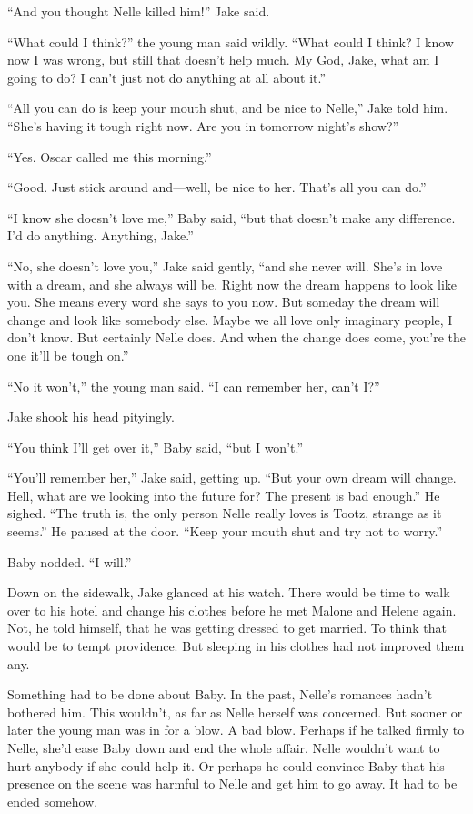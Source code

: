 \documentclass{novel}
\begin{document}
“And you thought Nelle killed him!” Jake said.

“What could I think?” the young man said wildly. “What could I think? I know now I was wrong, but still that doesn’t help much. My God, Jake, what am I going to do? I can’t just not do anything at all about it.”

“All you can do is keep your mouth shut, and be nice to Nelle,” Jake told him. “She’s having it tough right now. Are you in tomorrow night’s show?”

“Yes. Oscar called me this morning.”

“Good. Just stick around and—well, be nice to her. That’s all you can do.”

“I know she doesn’t love me,” Baby said, “but that doesn’t make any difference. I’d do anything. Anything, Jake.”

“No, she doesn’t love you,” Jake said gently, “and she never will. She’s in love with a dream, and she always will be. Right now the dream happens to look like you. She means every word she says to you now. But someday the dream will change and look like somebody else. Maybe we all love only imaginary people, I don’t know. But certainly Nelle does. And when the change does come, you’re the one it’ll be tough on.”

“No it won’t,” the young man said. “I can remember her, can’t I?”

Jake shook his head pityingly.

“You think I’ll get over it,” Baby said, “but I won’t.”

“You’ll remember her,” Jake said, getting up. “But your own dream will change. Hell, what are we looking into the future for? The present is bad enough.” He sighed. “The truth is, the only person Nelle really loves is Tootz, strange as it seems.” He paused at the door. “Keep your mouth shut and try not to worry.”

Baby nodded. “I will.”

Down on the sidewalk, Jake glanced at his watch. There would be time to walk over to his hotel and change his clothes before he met Malone and Helene again. Not, he told himself, that he was getting dressed to get married. To think that would be to tempt providence. But sleeping in his clothes had not improved them any.

Something had to be done about Baby. In the past, Nelle’s romances hadn’t bothered him. This wouldn’t, as far as Nelle herself was concerned. But sooner or later the young man was in for a blow. A bad blow. Perhaps if he talked firmly to Nelle, she’d ease Baby down and end the whole affair. Nelle wouldn’t want to hurt anybody if she could help it. Or perhaps he could convince Baby that his presence on the scene was harmful to Nelle and get him to go away. It had to be ended somehow.
\end{document}
